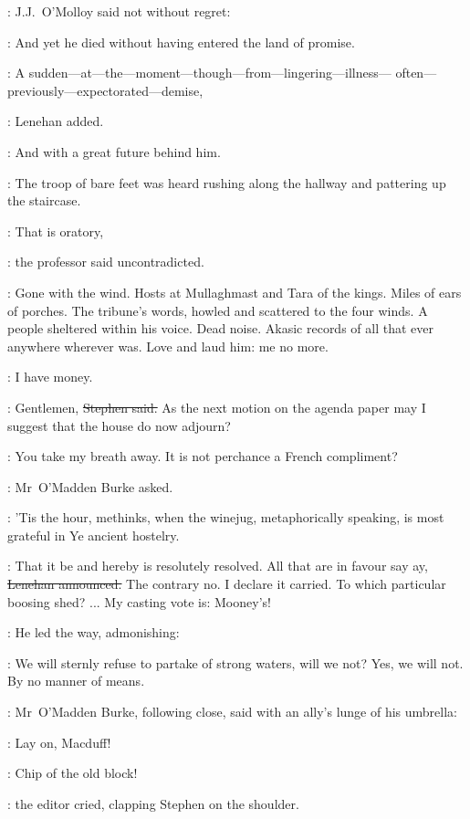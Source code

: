 
:
J.J.~O'Molloy said
not without regret:

\jjom:
And yet he died
without having entered the land of promise.

\lenehan:
A sudden---at---the---moment---though---from---lingering---illness---%
often---previously---expectorated---demise,

:
Lenehan added.

\lenehan:
And with a great future behind him.

:
The troop of bare feet was heard rushing along the hallway
and pattering up the staircase.

\machugh:
That is oratory,

:
the professor said uncontradicted.

\machugh:
Gone with the wind.
Hosts at Mullaghmast and Tara of the kings.
Miles of ears of porches.
The tribune's words,
howled and scattered to the four winds.
A people sheltered within his voice.
Dead noise.
Akasic records of all that ever anywhere wherever was.
Love and laud him: me no more.

\StephenInt:
I have money.

\Stephen:
Gentlemen,
\sout{Stephen said.}
As the next motion on the agenda paper
may I suggest that the house do now adjourn?

\omaddenburke:
You take my breath away.
It is not perchance a French compliment?

:
Mr~O'Madden Burke asked.

\omaddenburke:
'Tis the hour,
methinks,
when the winejug,
metaphorically speaking,
is most grateful in Ye ancient hostelry.

\lenehan:
That it be and hereby is resolutely resolved.
All that are in favour
say ay,
\sout{Lenehan announced.}
The contrary no.
I declare it carried.
To which particular boosing shed? ...
My casting vote is:
Mooney's!

:
He led the way,
admonishing:

\lenehan:
We will sternly refuse to partake of strong waters,
will we not?
Yes, we will not.
By no manner of means.

:
Mr~O'Madden Burke,
following close,
said with an ally's lunge of his umbrella:

\omaddenburke:
Lay on, Macduff!

\crawford:
Chip of the old block!

:
the editor cried,
clapping Stephen on the shoulder.


